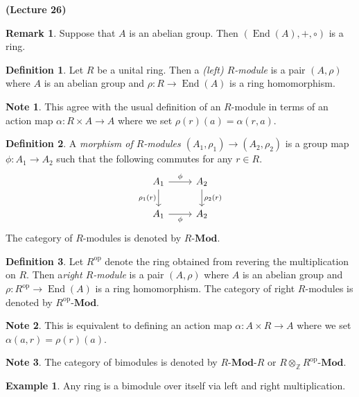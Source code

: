 \documentclass[10pt,letterpaper,cm]{nupset}
\theoremstyle{definition}
\newtheorem*{definition}{Definition}
\newtheorem{exmp}{Example}
\newtheorem{note}{Note}
\newtheorem{remark}{Remark}
\newcommand{\Z}{\mathbb Z}
\newcommand{\1}{\mathbf{1}}
\newcommand{\0}{\vec 0}
\DeclareMathOperator{\op}{op}
\DeclareMathOperator{\ed}{End}
\begin{document}
\begin{center}
{\textbf{(Lecture 26)}}
\end{center}

\begin{remark}
Suppose that $A$ is an abelian group. Then $(\ed(A), +, \circ)$ is a ring. 
\end{remark}

\begin{definition}
Let $R$ be a unital ring. Then a \textit{(left) $R$-module} is a pair $(A, \rho)$ where $A$ is an abelian group and $\rho : R \to \ed(A)$ is a ring homomorphism.
\end{definition}
\begin{note}
This agree with the usual definition of an $R$-module in terms of an action map $\alpha : R\times A \to A$ where we set $\rho(r)(a) = \alpha(r, a)$.
\end{note}

\begin{definition}
A \textit{morphism of $R$-modules $(A_1, \rho_1) \to (A_2, \rho_2)$} is a group map $\phi : A_1 \to A_2$ such that the following commutes for any $r\in R$.
\[
\begin{tikzcd}
A_1 \arrow[d, "\rho_1(r)"'] \arrow[r, "\phi"] & A_2 \arrow[d, "\rho_2(r)"] \\
A_1 \arrow[r, "\phi"'] & A_2
\end{tikzcd}
\] The category of $R$-modules is denoted by $R$-$\mathbf{Mod}$.
\end{definition}

\begin{definition}
Let $R^{\op}$ denote the ring obtained from revering the multiplication on $R$. Then a\textit{right $R$-module} is a pair $(A, \rho)$ where $A$ is an abelian group and $\rho : R^{\op} \to \ed(A)$ is a ring homomorphism. The category of right $R$-modules is denoted by $R^{\op}$-$\mathbf{Mod}$.
\begin{note}
This is equivalent to defining an action map $\alpha : A \times R \to A$ where we set $\alpha(a, r) = \rho(r)(a)$.
\end{note}
\end{definition}

\begin{note}
The category of bimodules is denoted by $R$-$\mathbf{Mod}$-$R$ or $R \otimes_{\Z}R^{\op}$-$\mathbf{Mod}$.
\end{note}

\begin{exmp}
Any ring is a bimodule over itself via left and right multiplication.
\end{exmp}
\end{document}

